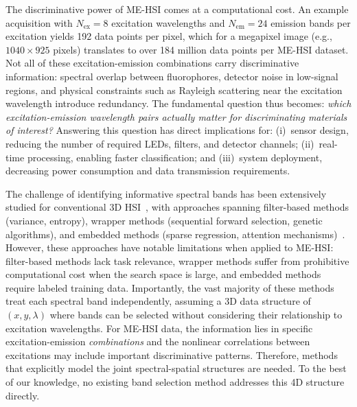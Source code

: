 The discriminative power of ME-HSI comes at a computational cost.
An example acquisition with $N_{\text{ex}} = 8$ excitation wavelengths and $N_{\text{em}} = 24$ emission bands per excitation yields 192 data points per pixel, which for a megapixel image (e.g., $1040 \times 925$ pixels) translates to over 184 million data points per ME-HSI dataset.
Not all of these excitation-emission combinations carry discriminative information: spectral overlap between fluorophores, detector noise in low-signal regions, and physical constraints such as Rayleigh scattering near the excitation wavelength introduce redundancy.
The fundamental question thus becomes: \emph{which excitation-emission wavelength pairs actually matter for discriminating materials of interest?}
Answering this question has direct implications for:
(i)~sensor design, reducing the number of required LEDs, filters, and detector channels;
(ii)~real-time processing, enabling faster classification; and
(iii)~system deployment, decreasing power consumption and data transmission requirements.

The challenge of identifying informative spectral bands has been extensively studied for conventional 3D HSI~\cite{sun2019hyperspectral,rasti2020featureextraction,jia2020survey,asfour2018,guan2018}, with approaches spanning filter-based methods (variance, entropy), wrapper methods (sequential forward selection, genetic algorithms), and embedded methods (sparse regression, attention mechanisms)~\cite{martinez2006comparison,chang2000constrained,pudil1994floating,pal2010feature,tibshirani1996regression,lorenzo2020attention}.
However, these approaches have notable limitations when applied to ME-HSI: filter-based methods lack task relevance, wrapper methods suffer from prohibitive computational cost when the search space is large, and embedded methods require labeled training data.
Importantly, the vast majority of these methods treat each spectral band independently, assuming a 3D data structure of $(x, y, \lambda)$ where bands can be selected without considering their relationship to excitation wavelengths.
For ME-HSI data, the information lies in specific excitation-emission \emph{combinations} and the nonlinear correlations between excitations may include important discriminative patterns.
Therefore, methods that explicitly model the joint spectral-spatial structures are needed.
To the best of our knowledge, no existing band selection method addresses this 4D structure directly.

